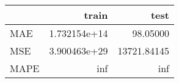 \begin{tabular}{lrr}
\toprule
{} &         train &         test \\
\midrule
MAE  &  1.732154e+14 &     98.05000 \\
MSE  &  3.900463e+29 &  13721.84145 \\
MAPE &           inf &          inf \\
\bottomrule
\end{tabular}

